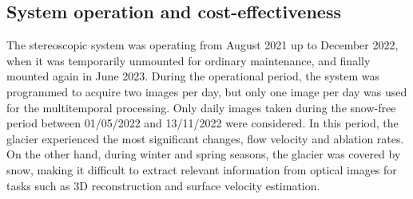 


\subsection{System operation and cost-effectiveness}

The stereoscopic system was operating from August 2021 up to December 2022, when it was
temporarily unmounted for ordinary maintenance, and finally mounted again in June 2023.
During the operational period, the system was programmed to acquire two images per day,
but only one image per day was used for the multitemporal processing.
Only daily images taken during the snow-free period between 01/05/2022 and
13/11/2022 were considered.
In this period, the glacier experienced the most significant changes, flow velocity
and ablation rates. On the other hand, during winter and spring seasons, the glacier was
covered by snow, making it difficult to extract relevant information from optical images
for tasks such as 3D reconstruction and surface velocity estimation.


